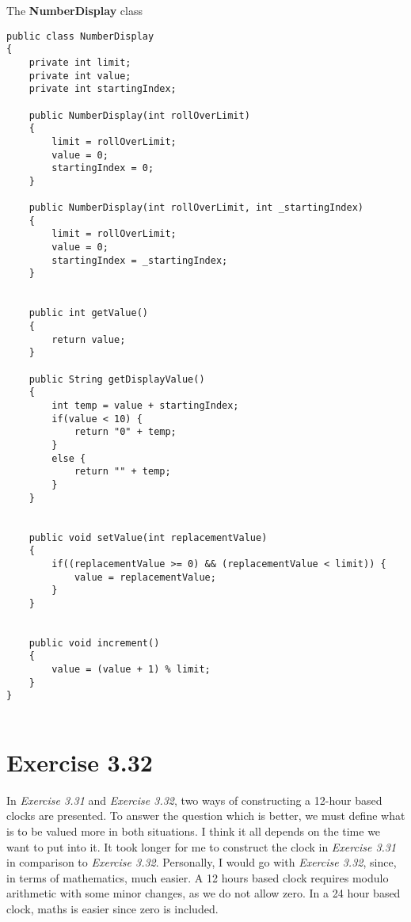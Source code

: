 \documentclass[10pt,a4paper]{article}
\begin{document}
The \textbf{NumberDisplay} class
\begin{lstlisting}
public class NumberDisplay
{
    private int limit;
    private int value;
    private int startingIndex;

    public NumberDisplay(int rollOverLimit)
    {
        limit = rollOverLimit;
        value = 0;
        startingIndex = 0;
    }
    
    public NumberDisplay(int rollOverLimit, int _startingIndex)
    {
        limit = rollOverLimit;
        value = 0;
        startingIndex = _startingIndex;
    }


    public int getValue()
    {
        return value;
    }

    public String getDisplayValue()
    {
        int temp = value + startingIndex;
        if(value < 10) {
            return "0" + temp;
        }
        else {
            return "" + temp;
        }
    }


    public void setValue(int replacementValue)
    {
        if((replacementValue >= 0) && (replacementValue < limit)) {
            value = replacementValue;
        }
    }


    public void increment()
    {
        value = (value + 1) % limit;
    }
}


\end{lstlisting}

\section*{Exercise 3.32}
In \textit{Exercise 3.31} and \textit{Exercise 3.32}, two ways of constructing a 12-hour based clocks are presented. To answer the question which is better, we must define what is to be valued more in both situations.    I think it all depends on the time we want to put into it. It took longer for me to construct the clock in \textit{Exercise 3.31} in comparison to \textit{Exercise  3.32}. Personally, I would go with \textit{Exercise 3.32}, since, in terms of mathematics, much easier. A 12 hours based  clock requires modulo arithmetic with some minor changes, as we do not allow zero. In a 24 hour based clock, maths is easier since zero is included.
\end{document}
